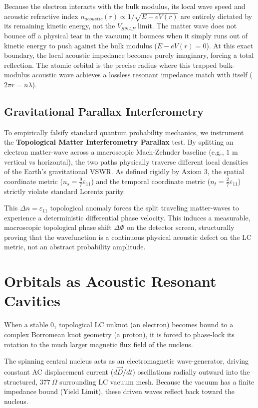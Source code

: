 Because the electron interacts with the bulk modulus, its local wave speed and acoustic refractive index $n_{acoustic}(r) \propto 1 / \sqrt{E - eV(r)}$ are entirely dictated by its remaining kinetic energy, not the $V_{SNAP}$ limit. The matter wave does not bounce off a physical tear in the vacuum; it bounces when it simply runs out of kinetic energy to push against the bulk modulus ($E - eV(r) = 0$). At this exact boundary, the local acoustic impedance becomes purely imaginary, forcing a total reflection. The atomic orbital is the precise radius where this trapped bulk-modulus acoustic wave achieves a lossless resonant impedance match with itself ($2\pi r = n \lambda$).

\subsection{Gravitational Parallax Interferometry}
To empirically falsify standard quantum probability mechanics, we instrument the \textbf{Topological Matter Interferometry Parallax} test. By splitting an electron matter-wave across a macroscopic Mach-Zehnder baseline (e.g., $1\text{ m}$ vertical vs horizontal), the two paths physically traverse different local densities of the Earth's gravitational VSWR. As defined rigidly by Axiom 3, the spatial coordinate metric ($n_s = \frac{9}{7}\varepsilon_{11}$) and the temporal coordinate metric ($n_t = \frac{2}{7}\varepsilon_{11}$) strictly violate standard Lorentz parity. 

This $\Delta n = \varepsilon_{11}$ topological anomaly forces the split traveling matter-waves to experience a deterministic differential phase velocity. This induces a measurable, macroscopic topological phase shift $\Delta\Phi$ on the detector screen, structurally proving that the wavefunction is a continuous physical acoustic defect on the LC metric, not an abstract probability amplitude.

\section{Orbitals as Acoustic Resonant Cavities}
When a stable $0_1$ topological LC unknot (an electron) becomes bound to a complex Borromean knot geometry (a proton), it is forced to phase-lock its rotation to the much larger magnetic flux field of the nucleus. 

The spinning central nucleus acts as an electromagnetic wave-generator, driving constant AC displacement current ($d\vec{D}/dt$) oscillations radially outward into the structured, $377 \ \Omega$ surrounding LC vacuum mesh. Because the vacuum has a finite impedance bound (Yield Limit), these driven waves reflect back toward the nucleus. 

